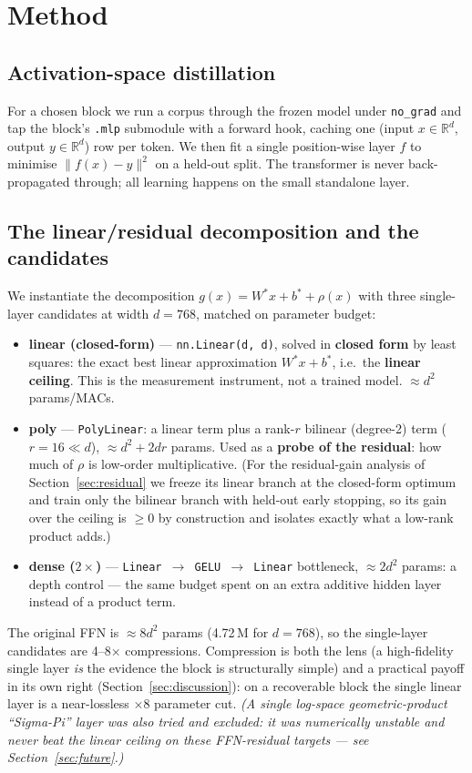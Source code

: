 \documentclass{article}
\begin{document}
\section{Method}
\label{sec:method}

\subsection{Activation-space distillation}
\label{sec:distill}

For a chosen block we run a corpus through the frozen model under \texttt{no\_grad} and tap
the block's \texttt{.mlp} submodule with a forward hook, caching one (input
$x\in\mathbb{R}^d$, output $y\in\mathbb{R}^d$) row per token. We then fit a single
position-wise layer $f$ to minimise $\lVert f(x)-y\rVert^2$ on a held-out split. The
transformer is never back-propagated through; all learning happens on the small standalone
layer.

\subsection{The linear/residual decomposition and the candidates}
\label{sec:candidates}

We instantiate the decomposition $g(x) = W^{*}x + b^{*} + \rho(x)$ with three single-layer
candidates at width $d = 768$, matched on parameter budget:
\begin{itemize}
\item \textbf{linear (closed-form)} --- \texttt{nn.Linear(d, d)}, solved in \textbf{closed
  form} by least squares: the exact best linear approximation $W^{*}x + b^{*}$, i.e.\ the
  \textbf{linear ceiling}. This is the measurement instrument, not a trained model.
  $\approx d^2$ params/MACs.
\item \textbf{poly} --- \texttt{PolyLinear}: a linear term plus a rank-$r$ bilinear (degree-2)
  term ($r = 16 \ll d$), $\approx d^2 + 2dr$ params. Used as a \textbf{probe of the residual}:
  how much of $\rho$ is low-order multiplicative. (For the residual-gain analysis of
  Section~\ref{sec:residual} we freeze its linear branch at the closed-form optimum and train
  only the bilinear branch with held-out early stopping, so its gain over the ceiling is
  $\ge 0$ by construction and isolates exactly what a low-rank product adds.)
\item \textbf{dense ($2\times$)} --- \texttt{Linear $\to$ GELU $\to$ Linear} bottleneck,
  $\approx 2d^2$ params: a depth control --- the same budget spent on an extra additive
  hidden layer instead of a product term.
\end{itemize}
The original FFN is $\approx 8d^2$ params (4.72\,M for $d = 768$), so the single-layer
candidates are 4--8$\times$ compressions. Compression is both the lens (a high-fidelity
single layer \emph{is} the evidence the block is structurally simple) and a practical payoff
in its own right (Section~\ref{sec:discussion}): on a recoverable block the single linear
layer is a near-lossless $\times 8$ parameter cut. \emph{(A single log-space
geometric-product ``Sigma-Pi'' layer was also tried and excluded: it was numerically
unstable and never beat the linear ceiling on these FFN-residual targets --- see
Section~\ref{sec:future}.)}
\end{document}
